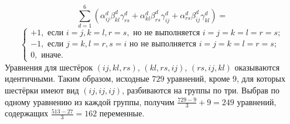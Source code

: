 \documentclass[12pt]{article}
\begin{document}
    \[\sum_{d=1}^{6} (\alpha^d_{ij} \beta^d_{kl} \gamma^d_{rs}+\alpha^d_{kl} \beta^d_{rs} \gamma^d_{ij}+\alpha^d_{rs} \beta^d_{ij} \gamma^d_{kl})=\]
    \begin{equation}
        \begin{cases}
            +1, \text{ если } i = j, k = l, r = s,  \text{ но не выполняется } i = j = k = l = r = s;\\
            -1, \text{ если } j = k, l = r, s = i  \text{ но не выполняется } i = j = k = l = r = s;\\
            0, \text{ иначе.}
        \end{cases}\label{eq:10}
    \end{equation}
    Уравнения для шестёрок $ (ij, kl, rs) $, $ (kl, rs, ij) $, $ (rs, ij, kl) $ оказываются идентичными.
    Таким образом, исходные $ 729 $ уравнений, кроме $ 9 $, для которых шестёрки имеют вид
    $ (ij, ij, ij) $, разбиваются на группы по три.
    Выбрав по одному уравнению из каждой группы, получим $ \frac{729 - 9}{3} + 9 = 249 $ уравнений, содержащих
    $ \frac{513 - 27}{3} = 162 $ переменные.
\end{document}
